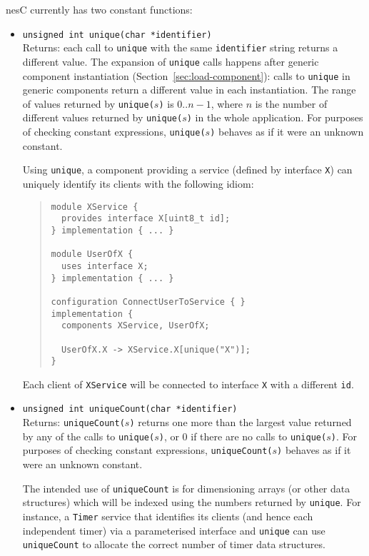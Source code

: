\documentclass[11pt,letterpaper]{article}
\newcommand{\kw}[1]{{\tt #1}}
\newcommand{\code}[1]{{\tt #1}}
\newcommand{\nesc}{nesC\xspace}
\begin{document}
\nesc currently has two constant functions:
\begin{itemize}
\item 
\code{unsigned int unique(char *identifier)} \\ Returns: each call to
\code{unique} with the same \code{identifier} string returns a different
value. The expansion of \code{unique} calls happens after generic component
instantiation (Section~\ref{sec:load-component}): calls to \code{unique} in
generic components return a different value in each instantiation. The
range of values returned by \code{unique($s$)} is $0 .. n-1$, where $n$ is
the number of different values returned by \code{unique($s$)} in the whole
application. For purposes of checking constant expressions,
\code{unique($s$)} behaves as if it were an unknown constant.

Using \code{unique}, a component providing a service (defined by interface
\code{X}) can uniquely identify its clients with the following idiom:
\begin{quote}
\begin{verbatim}
module XService {
  provides interface X[uint8_t id];
} implementation { ... }

module UserOfX {
  uses interface X;
} implementation { ... }

configuration ConnectUserToService { }
implementation {
  components XService, UserOfX;

  UserOfX.X -> XService.X[unique("X")];
}
\end{verbatim}
\end{quote}
Each client of \code{XService} will be connected to interface \code{X} with
a different \code{id}.

\item \code{unsigned int uniqueCount(char *identifier)} \\ Returns:
\code{uniqueCount($s$)} returns one more than the largest value returned by
any of the calls to \code{unique($s$)}, or 0 if there are no calls to
\code{unique($s$)}. For purposes of checking constant expressions,
\code{uniqueCount($s$)} behaves as if it were an unknown constant.

The intended use of \code{uniqueCount} is for dimensioning arrays (or other
data structures) which will be indexed using the numbers returned by
\kw{unique}. For instance, a \kw{Timer} service that identifies its clients
(and hence each independent timer) via a parameterised interface and
\kw{unique} can use \kw{uniqueCount} to allocate the correct number of
timer data structures.

\end{itemize}
\end{document}
